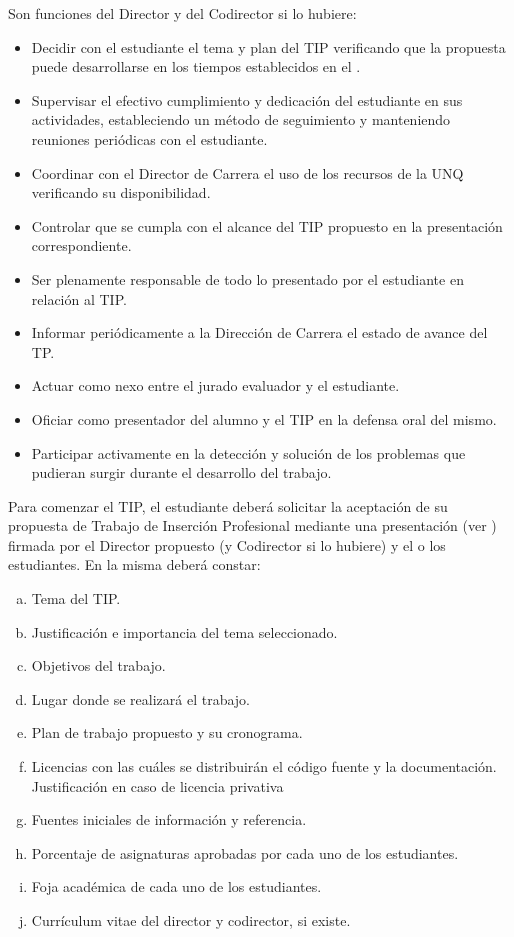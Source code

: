 \articulo Son funciones del Director y del Codirector si lo hubiere:
\begin{itemize}
 \item Decidir con el estudiante el tema y plan del TIP verificando que la
 propuesta puede desarrollarse en los tiempos establecidos en el
 \artHoras.
 \item Supervisar el efectivo cumplimiento y dedicación del estudiante en
 sus actividades, estableciendo un método de seguimiento y
 manteniendo reuniones periódicas con el estudiante.
 \item Coordinar con el Director de Carrera el uso de los recursos de la
 UNQ verificando su disponibilidad.
 \item Controlar que se cumpla con el alcance del TIP propuesto en la
 presentación correspondiente.
 \item Ser plenamente responsable de todo lo presentado por el
 estudiante en relación al TIP.
 \item Informar periódicamente a la Dirección de Carrera el estado de
 avance del TP.
 \item Actuar como nexo entre el jurado evaluador y el estudiante.
 \item Oficiar como presentador del alumno y el TIP en la defensa oral del
 mismo.
 \item Participar activamente en la detección y solución de los problemas
 que pudieran surgir durante el desarrollo del trabajo.
\end{itemize}



\articulo Para comenzar el TIP, el estudiante deberá solicitar la aceptación
de su propuesta de Trabajo de Inserción Profesional mediante una presentación (ver
\anexoPresentacionPlan) firmada por el Director propuesto (y Codirector si lo
hubiere) y el o los estudiantes. En la misma deberá constar:

\begin{enumerate}[a.]
\item Tema del TIP.
\item Justificación e importancia del tema seleccionado.
\item Objetivos del trabajo.
\item Lugar donde se realizará el trabajo.
\item Plan de trabajo propuesto y su cronograma.
\item Licencias con las cuáles se distribuirán el código fuente y la
documentación.
Justificación en caso de licencia privativa \nuevo{ }
\item Fuentes iniciales de información y referencia.
\item Porcentaje de asignaturas aprobadas por cada uno de los estudiantes.
\item Foja académica de cada uno de los estudiantes.
\item Currículum vitae del director y codirector, si existe.
\end{enumerate}

